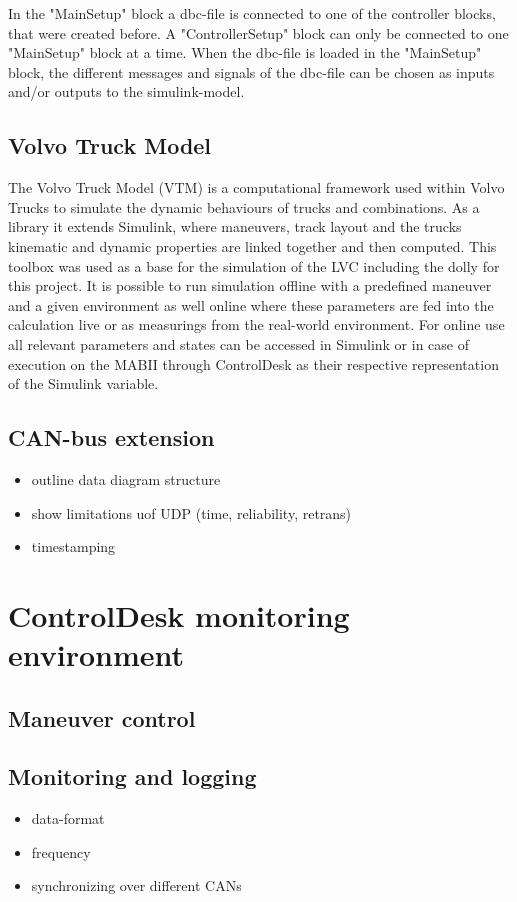 \documentclass[ExampleMasters.tex]{subfiles}
\begin{document}
In the "MainSetup" block a dbc-file is connected to one of the controller blocks, that were created before. A "ControllerSetup" block can only be connected to one "MainSetup" block at a time. When the dbc-file is loaded in the "MainSetup" block, the different messages and signals of the dbc-file can be chosen as inputs and/or outputs to the simulink-model.
\subsection{Volvo Truck Model}
\label{sec:VTM}
The Volvo Truck Model (VTM) is a computational framework used within Volvo Trucks to simulate the dynamic behaviours of trucks and combinations. As a library it extends Simulink, where maneuvers, track layout and the trucks kinematic and dynamic properties are linked together and then computed. This toolbox was used as a base for the simulation of the LVC including the dolly for this project. It is possible to run simulation offline with a predefined maneuver and a given environment as well online where these parameters are fed into the calculation live or as measurings from the real-world environment. For online use all relevant parameters and states can be accessed in Simulink or in case of execution on the MABII through ControlDesk as their respective representation of the Simulink variable. 

\subsection{CAN-bus extension}
\label{sec:can_bus_extension_software}

\begin{itemize}
	\item outline data diagram structure
	\item show limitations uof UDP (time, reliability, retrans)
	\item timestamping
	
	
\end{itemize}


\section{ControlDesk monitoring environment}
\label{sec:control_desk}
\subsection{Maneuver control}


\subsection{Monitoring and logging}
\begin{itemize}
	\item data-format
	\item frequency
	\item synchronizing over different CANs	
\end{itemize}
\end{document}
